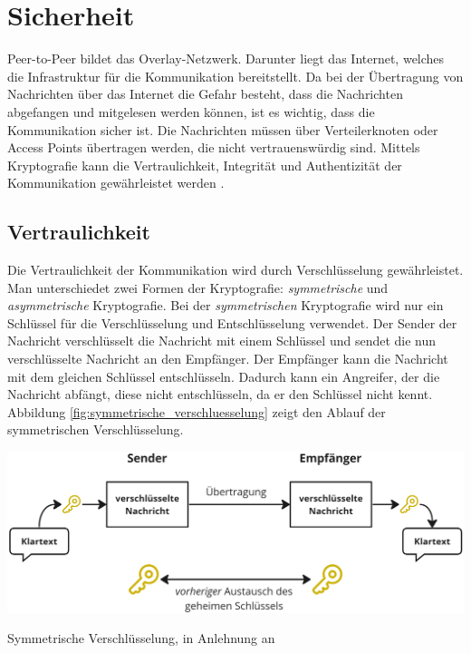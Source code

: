 \section{Sicherheit}
\label{sec:sicherheit_basics}

Peer-to-Peer bildet das Overlay-Netzwerk. Darunter liegt das Internet, welches die Infrastruktur für die Kommunikation bereitstellt. Da bei der Übertragung von Nachrichten über das Internet die Gefahr besteht, dass die Nachrichten abgefangen und mitgelesen werden können, ist es wichtig, dass die Kommunikation sicher ist. Die Nachrichten müssen über Verteilerknoten oder Access Points übertragen werden, die nicht vertrauenswürdig sind. Mittels Kryptografie kann die Vertraulichkeit, Integrität und Authentizität der Kommunikation gewährleistet werden \Parencite[S. 7]{Hellmann_IT-Sicherheit}.


\subsection{Vertraulichkeit}

Die Vertraulichkeit der Kommunikation wird durch Verschlüsselung gewährleistet. Man unterschiedet zwei Formen der Kryptografie: \textit{symmetrische} und \textit{asymmetrische} Kryptografie. Bei der \textit{symmetrischen} Kryptografie wird nur ein Schlüssel für die Verschlüsselung und Entschlüsselung verwendet. Der Sender der Nachricht verschlüsselt die Nachricht mit einem Schlüssel und sendet die nun verschlüsselte Nachricht an den Empfänger. Der Empfänger kann die Nachricht mit dem gleichen Schlüssel entschlüsseln. Dadurch kann ein Angreifer, der die Nachricht abfängt, diese nicht entschlüsseln, da er den Schlüssel nicht kennt. Abbildung \ref{fig:symmetrische_verschluesselung} zeigt den Ablauf der symmetrischen Verschlüsselung.

\begin{center}
    \captionsetup{type=figure}
    \includegraphics[width=1\linewidth]{images/symmetric_encryption.png}
    \caption{Symmetrische Verschlüsselung, in Anlehnung an \cite{ElektronikKompendium_symmetrischeVerschluesselung}}
    \label{fig:symmetrische_verschluesselung}
\end{center}

